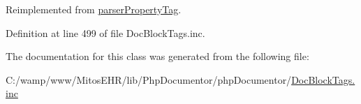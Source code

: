 \-Reimplemented from \hyperlink{classparser_property_tag_a4a925d6b38bcf3957c713a7d3dc7da1f}{parser\-Property\-Tag}.



\-Definition at line 499 of file \-Doc\-Block\-Tags.\-inc.



\-The documentation for this class was generated from the following file\-:\begin{DoxyCompactItemize}
\item 
\-C\-:/wamp/www/\-Mitos\-E\-H\-R/lib/\-Php\-Documentor/php\-Documentor/\hyperlink{_doc_block_tags_8inc}{\-Doc\-Block\-Tags.\-inc}\end{DoxyCompactItemize}
